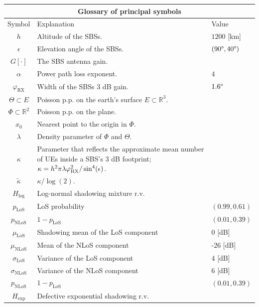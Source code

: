 \documentclass[lettersize,journal]{IEEEtran}
\newcommand{\R}{\mathbb{R}}
\begin{document}
\begin{table}
  \begin{center}
    \begin{tabular}{| c | p{4.5cm}  |p{1.5cm}|}
      \hline
      \multicolumn{3}{|c|}{Glossary of principal symbols} \\
      \hline
      Symbol& Explanation &Value
      \\ 
      \hline
      $h$ & Altitude of the SBSs.&$1200$ [km] \\
      $\epsilon$ & Elevation angle of the SBSs.& $(90 \degree,40 \degree)$ \\
      $G[\cdot]$ & The SBS antenna gain.&\\
      $\alpha$ &Power path loss exponent.& $4$\\
      $\varphi_{\text{RX}}$ & Width of the SBSs $3$ dB gain.& $1.6 \degree$  \\
      $\Theta \subset E $ & Poisson p.p. on the earth's surface $E \subset \R^3$.& \\
      $\Phi \subset \R^2$ & Poisson p.p. on the plane. &\\
      $x_0$ & Nearest point to the origin in $\Phi$.&  \\
      $\lambda$ & Density parameter of $\Phi$ and $\Theta$.& \\
      $\kappa$ & Parameter that reflects the approximate mean number of UEs inside a SBS's $3$ dB footprint;  $\kappa = h^2\pi \lambda \varphi_{\textup{RX}}^2/\sin^4(\epsilon)$.& \\
      ${\tilde{\kappa}}$ &  $\kappa/\log(2)$.&\\
      $H_{\text{log}}$ & Log-normal shadowing mixture r.v.&     \\
      $p_{\text{LoS}}$& LoS probability & $(0.99,0.61)$\\
      $p_{\text{NLoS}}$&  $1-p_{\text{LoS}}$ & $(0.01,0.39)$\\
      $\mu_{\text{LoS}}$& Shadowing mean of the LoS component & 0 [dB] \\
      $\mu_{\text{NLoS}}$& Mean of the NLoS component & -26 [dB] \\
      $\sigma_{\text{LoS}}$& Variance of the LoS component & 4 [dB] \\
      $\sigma_{\text{NLoS}}$& Variance of the NLoS component & 6 [dB] \\
      $p_{\text{NLoS}}$&  $1-p_{\text{LoS}}$ & $(0.01,0.39)$\\
      $H_{\text{exp}}$ & Defective exponential shadowing r.v.    & \\

\end{tabular}
\end{center}
\end{table}
\end{document}
